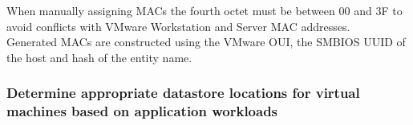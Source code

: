 When manually assigning MACs the fourth octet must be between 00 and 3F to
avoid conflicts with VMware Workstation and Server MAC addresses.\\

Generated MACs are constructed using the VMware OUI, the SMBIOS UUID of the
host and hash of the entity name.

\subsubsection{Determine appropriate datastore locations for virtual machines based on application workloads}
